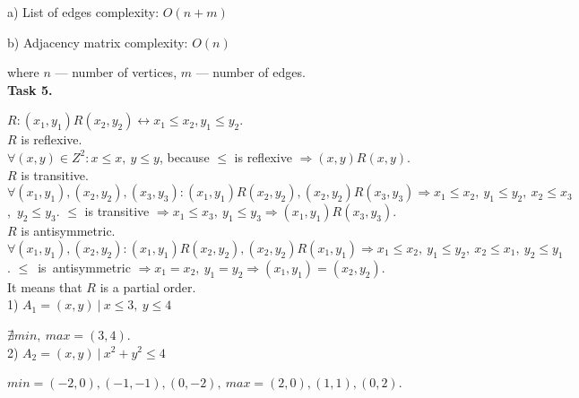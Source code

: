 \documentclass{article}
\begin{document}
a) List of edges complexity: $O(n+m)$

b) Adjacency matrix complexity: $O(n)$

where $n$ --- number of vertices, $m$ --- number of edges.\\

\textbf{Task 5.}

$R: (x_1, y_1) R (x_2, y_2) \leftrightarrow x_1 \leq x_2, y_1 \leq y_2$.\\

$R$ is reflexive.\\
$\forall (x,y) \in Z^2: x \leq x,~y \leq y$, because $\leq$ is reflexive $\Rightarrow (x,y) R (x,y)$.\\

$R$ is transitive.\\
$\forall (x_1,y_1), (x_2,y_2), (x_3,y_3): (x_1,y_1) R (x_2,y_2), (x_2,y_2) R (x_3,y_3) \Rightarrow x_1 \leq x_2,~y_1 \leq y_2,~x_2 \leq x_3$,\ $y_2 \leq y_3$. $\leq$ is transitive $\Rightarrow x_1 \leq x_3,~y_1 \leq y_3 \Rightarrow (x_1,y_1) R (x_3,y_3)$.\\

$R$ is antisymmetric.\\
$\forall (x_1,y_1), (x_2,y_2): (x_1,y_1) R (x_2,y_2), (x_2,y_2) R (x_1,y_1) \Rightarrow x_1 \leq x_2,~y_1 \leq y_2,~x_2 \leq x_1,~y_2 \leq y_1$. $\leq$~is~antisymmetric $\Rightarrow x_1 = x_2,~y_1 = y_2 \Rightarrow (x_1,y_1) = (x_2,y_2)$.\\

It means that $R$ is a partial order.\\

1) $A_1 = {(x,y)~|~x \leq 3,~y \leq 4}$

$\nexists min,~max = (3,4)$.\\

2) $A_2 = {(x,y)~|~x^2 + y^2 \leq 4}$

$min = {(-2,0), (-1,-1), (0,-2)},~max = {(2,0), (1,1), (0,2)}$.

 
\end{document}

